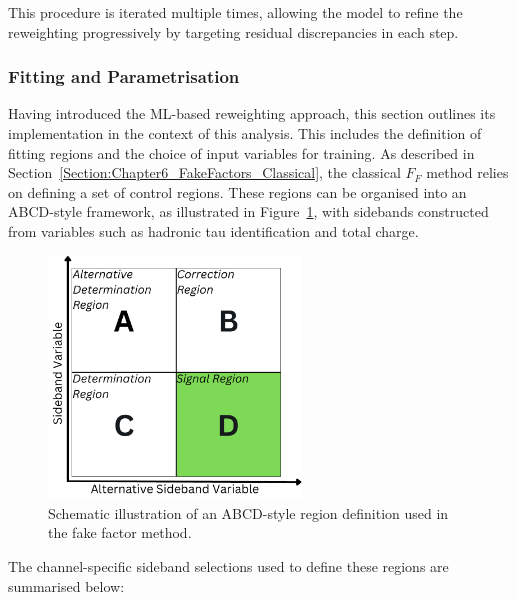 This procedure is iterated multiple times, allowing the model to refine the reweighting progressively by targeting residual discrepancies in each step.

\subsubsection{Fitting and Parametrisation}
\label{Section6:Fitting_Parametrisation}
Having introduced the ML-based reweighting approach, this section outlines its implementation in the context of this analysis. This includes the definition of fitting regions and the choice of input variables for training. As described in Section~\ref{Section:Chapter6_FakeFactors_Classical}, the classical $F_F$ method relies on defining a set of control regions. These regions can be organised into an ABCD-style framework, as illustrated in Figure~\ref{Figure:Chapter6_ABCD}, with sidebands constructed from variables such as hadronic tau identification and total charge.

\begin{figure}[!htbp]
\centering
\includegraphics[width=0.6\textwidth]{Figures/Chapter6/ABCD.pdf}
\caption[ABCD-style region definition for fake factor estimation.]{Schematic illustration of an ABCD-style region definition used in the fake factor method.}
\label{Figure:Chapter6_ABCD}
\end{figure}

The channel-specific sideband selections used to define these regions are summarised below:

